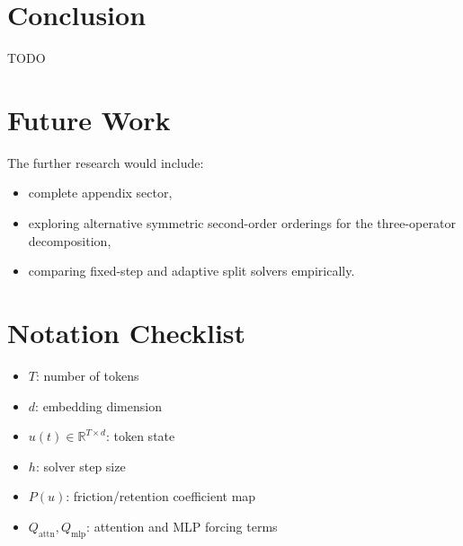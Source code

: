 \documentclass{article}
\newcommand{\R}{\mathbb{R}}
\newcommand{\Attn}{\mathrm{attn}}
\newcommand{\MLP}{\mathrm{mlp}}
\begin{document}
\section{Conclusion}
TODO

\section{Future Work}
The further research would include:

\begin{itemize}[leftmargin=1.5em]
    \item complete appendix sector,
    \item exploring alternative symmetric second-order orderings for the three-operator decomposition,
    \item comparing fixed-step and adaptive split solvers empirically.
\end{itemize}

\appendix
\section{Notation Checklist}
\begin{itemize}[leftmargin=1.5em]
    \item $T$: number of tokens
    \item $d$: embedding dimension
    \item $u(t) \in \R^{T \times d}$: token state
    \item $h$: solver step size
    \item $P(u)$: friction/retention coefficient map
    \item $Q_{\Attn}, Q_{\MLP}$: attention and MLP forcing terms
\end{itemize}
\end{document}
